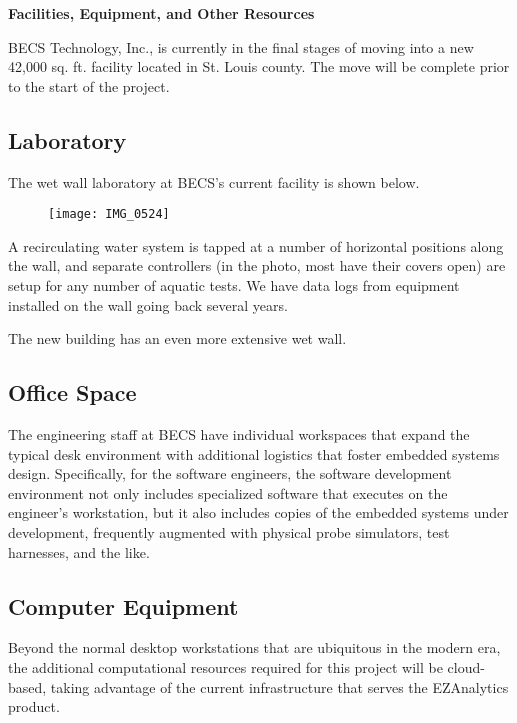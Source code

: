 \documentclass[11pt]{article}
\begin{document}
\pagestyle{plain}
\thispagestyle{plain}

\begin{center}
\textbf{\Large Facilities, Equipment, and Other Resources}
\end{center}

BECS Technology, Inc., is currently in the final stages of
moving into a new 42,000 sq. ft. facility located in
St. Louis county.
The move will be complete prior to the start of the project.

\subsection*{Laboratory}

The wet wall laboratory at BECS's current facility is shown below.

\begin{figure}[h]
 \center
\texttt{[image: IMG\_0524]}
\end{figure}

A recirculating water system is tapped at a number of horizontal
positions along the wall, and separate controllers (in the photo,
most have their covers open) are setup for any number of aquatic tests.
We have data logs from equipment installed on the wall going back
several years.

The new building has an even more extensive wet wall.

\subsection*{Office Space}

The engineering staff at BECS have individual workspaces that
expand the typical desk environment with additional logistics
that foster embedded systems design.
Specifically, for the software engineers, the software development
environment not only includes specialized software that executes
on the engineer’s workstation, but it also includes copies of
the embedded systems under development, frequently augmented with
physical probe simulators, test harnesses, and the like.

\subsection*{Computer Equipment}

Beyond the normal desktop workstations that are ubiquitous in
the modern era, the additional computational resources required
for this project will be cloud-based, taking advantage of the current
infrastructure that serves the EZAnalytics\texttrademark{} product.
\end{document}
